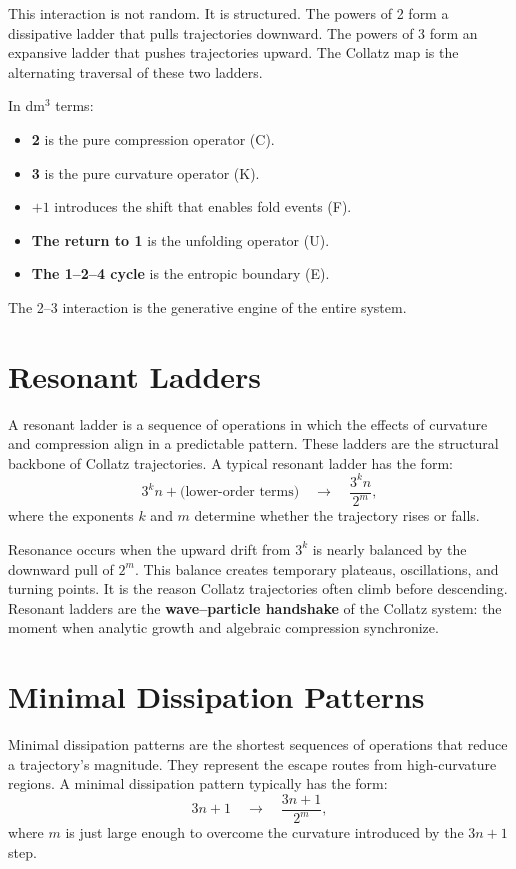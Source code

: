 \documentclass[14pt, twoside, openright]{book}
\theoremstyle{definition}
\theoremstyle{remark}
\begin{document}
This interaction is not random. It is structured. The powers of 2 form a
dissipative ladder that pulls trajectories downward. The powers of 3 form an
expansive ladder that pushes trajectories upward. The Collatz map is the
alternating traversal of these two ladders.

In dm$^{3}$ terms:

\begin{itemize}[leftmargin=2em]
  \item \textbf{2} is the pure compression operator (C).
  \item \textbf{3} is the pure curvature operator (K).
  \item \textbf{$+1$} introduces the shift that enables fold events (F).
  \item \textbf{The return to 1} is the unfolding operator (U).
  \item \textbf{The 1--2--4 cycle} is the entropic boundary (E).
\end{itemize}

The 2--3 interaction is the generative engine of the entire system.

\section{Resonant Ladders}

A resonant ladder is a sequence of operations in which the effects of curvature
and compression align in a predictable pattern. These ladders are the structural
backbone of Collatz trajectories. A typical resonant ladder has the form:
\[
  3^{k} n + \text{(lower-order terms)} \quad \longrightarrow \quad
  \frac{3^{k} n}{2^{m}},
\]
where the exponents $k$ and $m$ determine whether the trajectory rises or falls.

Resonance occurs when the upward drift from $3^{k}$ is nearly balanced by the
downward pull of $2^{m}$. This balance creates temporary plateaus, oscillations,
and turning points. It is the reason Collatz trajectories often climb before
descending. Resonant ladders are the \textbf{wave--particle handshake} of the
Collatz system: the moment when analytic growth and algebraic compression
synchronize.

\section{Minimal Dissipation Patterns}

Minimal dissipation patterns are the shortest sequences of operations that reduce
a trajectory's magnitude. They represent the escape routes from high-curvature
regions. A minimal dissipation pattern typically has the form:
\[
  3n + 1 \quad \longrightarrow \quad \frac{3n+1}{2^{m}},
\]
where $m$ is just large enough to overcome the curvature introduced by the
$3n+1$ step.
\end{document}

